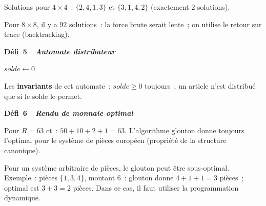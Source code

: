 Solutions pour $4\times4$~: $\{2,4,1,3\}$ et $\{3,1,4,2\}$ (exactement $2$ solutions).

Pour $8\times8$, il y a $92$ solutions~: la force brute serait lente~;
on utilise le retour sur trace (backtracking).

\noindent{}
{\color{BO}\bfseries\small D\'efi~5~\textendash\ \textit{Automate distributeur}}
\par\smallskip

\begin{algorithm}[H]
\caption{Automate distributeur}
$\mathit{solde} \leftarrow 0$\;
\end{algorithm}

Les \textbf{invariants} de cet automate~:
$\mathit{solde}\geq0$ toujours~;
un article n'est distribu\'e que si le solde le permet.

\noindent{}
{\color{BO}\bfseries\small D\'efi~6~\textendash\ \textit{Rendu de monnaie optimal}}
\par\smallskip

\begin{algorithm}[H]
\caption{Rendu de monnaie glouton}
\end{algorithm}

Pour $R=63$ ct~: $50+10+2+1=63$. L'algorithme glouton donne toujours l'optimal
pour le syst\`eme de pi\`eces europ\'een (propri\'et\'e de la structure canonique).

Pour un syst\`eme arbitraire de pi\`eces, le glouton peut \^etre sous-optimal.
Exemple~: pi\`eces $\{1,3,4\}$, montant $6$~:
glouton donne $4+1+1=3$ pi\`eces~; optimal est $3+3=2$ pi\`eces.
Dans ce cas, il faut utiliser la programmation dynamique.


